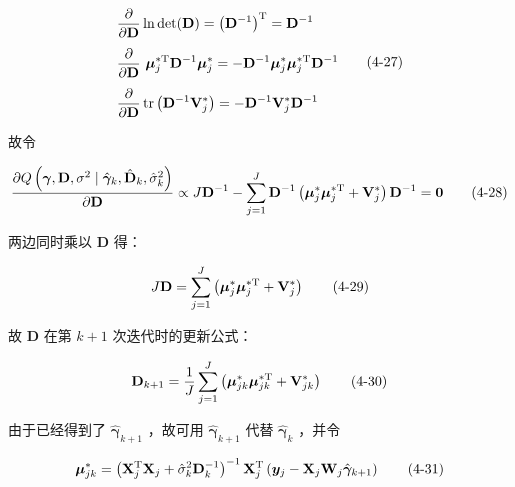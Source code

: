 \documentclass[12pt,a4paper]{ctexart}
\makeatletter
\numberwithin{figure}{section}
\numberwithin{table}{section}
\let\ltx@orig@tag\tag
\renewcommand{\tag}[1]{\refstepcounter{equation}\ltx@orig@tag{#1}}%
\makeatother
\begin{document}
\begin{equation}
\begin{aligned}
&\frac{\partial}{\partial\mathbf{D}}\ln\det(\mathbf{D})=\left(\mathbf{D}^{-1}\right)^{\mathrm{T}}=\mathbf{D}^{-1}\\[4pt]
&\frac{\partial}{\partial\mathbf{D}}\ \boldsymbol{\mu}_{j}^{*\mathrm{T}}\mathbf{D}^{-1}\boldsymbol{\mu}_{j}^{*}=-\mathbf{D}^{-1}\boldsymbol{\mu}_{j}^{*}\boldsymbol{\mu}_{j}^{*\mathrm{T}}\mathbf{D}^{-1}\\[4pt]
&\frac{\partial}{\partial\mathbf{D}}\operatorname{tr}\left(\mathbf{D}^{-1}\mathbf{V}_{j}^{*}\right)=-\mathbf{D}^{-1}\mathbf{V}_{j}^{*}\mathbf{D}^{-1}
\end{aligned} \tag{4-27}
\end{equation}

故令

\begin{equation}
\frac{\partial Q\left(\boldsymbol{\gamma},\mathbf{D},\sigma^{2}\mid\hat{\boldsymbol{\gamma}}_{k},\hat{\mathbf{D}}_{k},\hat{\sigma}_{k}^{2}\right)}{\partial\mathbf{D}}\propto J\mathbf{D}^{-1}-\sum_{j=1}^{J}\mathbf{D}^{-1}\left(\boldsymbol{\mu}_{j}^{*}\boldsymbol{\mu}_{j}^{*\mathrm{T}}+\mathbf{V}_{j}^{*}\right)\mathbf{D}^{-1}=\mathbf{0} \tag{4-28}
\end{equation}

两边同时乘以 $\mathbf{D}$ 得：

\begin{equation}
J\mathbf{D}=\sum_{j=1}^{J}\left(\boldsymbol{\mu}_{j}^{*}\boldsymbol{\mu}_{j}^{*\mathrm{T}}+\mathbf{V}_{j}^{*}\right) \tag{4-29}
\end{equation}

故 $\mathbf{D}$ 在第 $k+1$ 次迭代时的更新公式：

\begin{equation}
\mathbf{D}_{k+1}=\frac{1}{J}\sum_{j=1}^{J}\left(\boldsymbol{\mu}_{jk}^{*}\boldsymbol{\mu}_{jk}^{*\mathrm{T}}+\mathbf{V}_{jk}^{*}\right) \tag{4-30}
\end{equation}

由于已经得到了 $\hat{\boldsymbol{\gamma}}_{k+1}$ ，故可用 $\hat{\boldsymbol{\gamma}}_{k+1}$ 代替 $\hat{\boldsymbol{\gamma}}_{k}$ ，并令

\begin{equation}
\boldsymbol{\mu}_{jk}^{*}=\left(\mathbf{X}_{j}^{\mathrm{T}}\mathbf{X}_{j}+\hat{\sigma}_{k}^{2}\mathbf{D}_{k}^{-1}\right)^{-1}\mathbf{X}_{j}^{\mathrm{T}}\left(\boldsymbol{y}_{j}-\mathbf{X}_{j}\mathbf{W}_{j}\hat{\boldsymbol{\gamma}}_{k+1}\right) \tag{4-31}
\end{equation}
\end{document}
